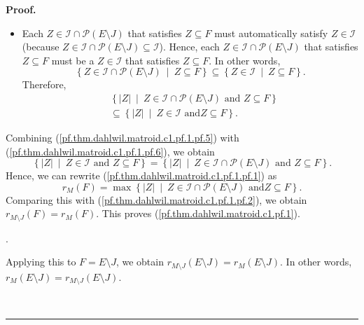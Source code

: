 \documentclass[numbers=enddot,12pt,final,onecolumn,notitlepage]{scrartcl}%
\theoremstyle{definition}
\newenvironment{proof}[1][Proof]{\noindent\textbf{#1.} }{\ \rule{0.5em}{0.5em}}
\newenvironment{verlong}{}{}
\begin{document}
\begin{verlong}
\begin{proof}
{\begin{itemize}
\begin{align}
\cap\mathcal{P}\left(  E\setminus J\right)  \text{ and }Z\subseteq F\right\}
. \label{pf.thm.dahlwil.matroid.c1.pf.1.pf.5}%
\end{align}
\par
\item Each $Z\in\mathcal{I}\cap\mathcal{P}\left(  E\setminus J\right)  $ that
satisfies $Z\subseteq F$ must automatically satisfy $Z\in\mathcal{I}$ (because
$Z\in\mathcal{I}\cap\mathcal{P}\left(  E\setminus J\right)  \subseteq
\mathcal{I}$). Hence, each $Z\in\mathcal{I}\cap\mathcal{P}\left(  E\setminus
J\right)  $ that satisfies $Z\subseteq F$ must be a $Z\in\mathcal{I}$ that
satisfies $Z\subseteq F$. In other words,%
\[
\left\{  Z\in\mathcal{I}\cap\mathcal{P}\left(  E\setminus J\right)
\ \mid\ Z\subseteq F\right\}  \subseteq\left\{  Z\in\mathcal{I}\ \mid
\ Z\subseteq F\right\}  .
\]
Therefore,%
\begin{align}
&  \left\{  \left\vert Z\right\vert \ \mid\ Z\in\mathcal{I}\cap\mathcal{P}%
\left(  E\setminus J\right)  \text{ and }Z\subseteq F\right\} \nonumber\\
&  \subseteq\left\{  \left\vert Z\right\vert \ \mid\ Z\in\mathcal{I}\text{ and
}Z\subseteq F\right\}  . \label{pf.thm.dahlwil.matroid.c1.pf.1.pf.6}%
\end{align}
\end{itemize}
\par
Combining (\ref{pf.thm.dahlwil.matroid.c1.pf.1.pf.5}) with
(\ref{pf.thm.dahlwil.matroid.c1.pf.1.pf.6}), we obtain%
\[
\left\{  \left\vert Z\right\vert \ \mid\ Z\in\mathcal{I}\text{ and }Z\subseteq
F\right\}  =\left\{  \left\vert Z\right\vert \ \mid\ Z\in\mathcal{I}%
\cap\mathcal{P}\left(  E\setminus J\right)  \text{ and }Z\subseteq F\right\}
.
\]
Hence, we can rewrite (\ref{pf.thm.dahlwil.matroid.c1.pf.1.pf.1}) as
\[
r_{M}\left(  F\right)  =\max\left\{  \left\vert Z\right\vert \ \mid
\ Z\in\mathcal{I}\cap\mathcal{P}\left(  E\setminus J\right)  \text{ and
}Z\subseteq F\right\}  .
\]
Comparing this with (\ref{pf.thm.dahlwil.matroid.c1.pf.1.pf.2}), we obtain
$r_{M\setminus J}\left(  F\right)  =r_{M}\left(  F\right)  $. This proves
(\ref{pf.thm.dahlwil.matroid.c1.pf.1}).}.

Applying this to $F=E\setminus J$, we obtain $r_{M\setminus J}\left(
E\setminus J\right)  =r_{M}\left(  E\setminus J\right)  $. In other words,
$r_{M}\left(  E\setminus J\right)  =r_{M\setminus J}\left(  E\setminus
J\right)  $.


\end{proof}
\end{verlong}
\end{document}
